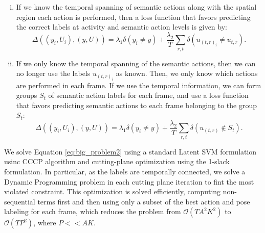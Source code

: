 \documentclass[10pt,letterpaper]{article}
\newcommand{\+}[1]{\ensuremath{{\boldsymbol #1}}}
\begin{document}
\begin{enumerate}[i.] 
\item If we know the temporal spanning of semantic actions along with the spatial region each action is performed, then a loss function that favors predicting the correct labels at activity and semantic action levels is given by:
\begin{equation}
\label{loss_func1}
\Delta( (y_i, U_i), (y, U)) =
  \lambda_1 \delta(y_i \neq y)
+  \frac{\lambda_2}{T}  \sum_{r,t} \delta(u_{{(t,r)}_i} \neq u_{t,r} ).
\end{equation}
\item If we only know the temporal spanning of the semantic actions, then we can no longer use the labels $u_{{(t,r)}_i}$ as known. Then, we only know which actions are performed in each frame. If we use the temporal information, we can form groups $S_{t}$ of semantic action labels for each frame, and use a loss function that favors predicting semantic actions to each frame belonging to the group $S_t$:
\begin{equation}
 \label{loss_func2}
\Delta( (y_i, U_i), (y, U)) =
  \lambda_1 \delta(y_i \neq y)
+  \frac{\lambda_2}{T}  \sum_{r,t} \delta(u_{{(t,r)}} \notin S_{t} ).
\end{equation}
\end{enumerate}
\vspace{0.3cm}
We solve Equation \ref{eq:big_problem2} using a standard Latent SVM formulation usinc CCCP algorithm and cutting-plane optimization using the 1-slack formulation. In particular, as the labels are temporally connected, we solve a Dynamic Programming problem in each cutting plane iteration to fint the most violated constraint. This optimization is solved efficiently, computing non-sequential terms first and then using only a subset of the best action and pose labeling for each frame, which reduces the problem from $\mathcal{O}(TA^2K^2)$ to $\mathcal{O}(TP^2)$, where  $P<<AK$.
\end{document}
